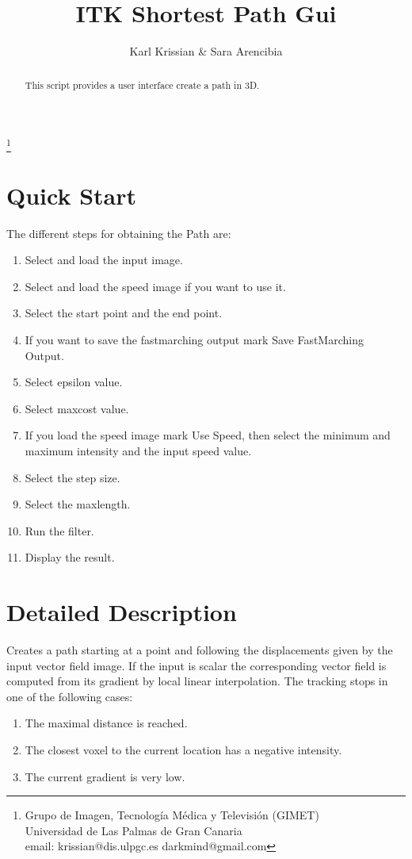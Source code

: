 \documentclass{article}
\begin{document}
\title{ITK Shortest Path Gui}
\author{Karl Krissian \& Sara Arencibia}
\thanks{
Grupo de Imagen, Tecnolog\'ia M\'edica y Televisi\'on (GIMET)\\
Universidad de Las Palmas de Gran Canaria\\
email: krissian@dis.ulpgc.es darkmind@gmail.com
}


\maketitle

\begin{abstract}
This script provides a user interface create a path in 3D.
\end{abstract}


\section{Quick Start}

The different steps for obtaining the Path are:
\begin{enumerate}
  \item Select and load the input image.
  \item Select and load the speed image if you want to use it.
  \item Select the start point and the end point.
  \item If you want to save the fastmarching output mark Save FastMarching Output.
  \item Select epsilon value.
  \item Select maxcost value.
  \item If you load the speed image mark Use Speed, then select the minimum and maximum intensity and the input speed value.
  \item Select the step size.
  \item Select the maxlength.
  \item Run the filter.
  \item Display the result.
\end{enumerate}


\section{Detailed Description}
Creates a path starting at a point and following the displacements given by the input vector field image. 
If the input is scalar the corresponding vector field is computed from its gradient by local linear interpolation.
The tracking stops in one of the following cases:
\begin{enumerate}
  \item The maximal distance is reached.
  \item The closest voxel to the current location has a negative intensity.
  \item The current gradient is very low.
\end{enumerate}
\end{document}
